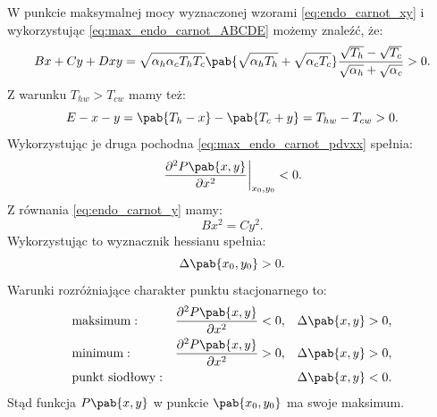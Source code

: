 W punkcie maksymalnej mocy wyznaczonej wzorami \eqref{eq:endo_carnot_xy} i wykorzystując \eqref{eq:max_endo_carnot_ABCDE} możemy znaleźć, że:
\begin{equation}
	Bx+Cy+Dxy = \sqrt{\alpha_{h}\alpha_{c}T_{h}T_{c}}\pab{\sqrt{\alpha_{h}T_{h}} + \sqrt{\alpha_{c}T_{c}}} \frac{\sqrt{T_{h}} - \sqrt{T_{c}}}{\sqrt{\alpha_{h}} + \sqrt{\alpha_{c}}} > 0.
\end{equation}
Z warunku \(T_{hw} > T_{cw}\) mamy też:
\begin{equation}
	E-x-y = \pab{T_h - x} - \pab{T_c + y} = T_{hw} - T_{cw} > 0.
\end{equation}
Wykorzystując je druga pochodna \eqref{eq:max_endo_carnot_pdvxx} spełnia:
\begin{equation}
	\pdv[order=2,delims-eval=.|]{P\pab{x,y}}{x}_{x_0,y_0} < 0.
\end{equation}
Z równania \eqref{eq:endo_carnot_y} mamy:
\begin{equation}
	Bx^2 = Cy^2.
\end{equation}
Wykorzystując to wyznacznik hessianu spełnia:
\begin{equation}
	\Delta\pab{x_0,y_0} > 0.
\end{equation}
Warunki rozróżniające charakter punktu stacjonarnego to:
\begin{align*}
	&\text{maksimum}: &
	\pdv[order=2]{P\pab{x,y}}{x} &< 0, &
	\Delta\pab{x,y} &> 0, \\
	&\text{minimum}: &
	\pdv[order=2]{P\pab{x,y}}{x} &> 0, &
	\Delta\pab{x,y} &> 0, \\
	&\text{punkt siodłowy}: &
	&&
	\Delta\pab{x,y} &< 0. \\
\end{align*}
Stąd funkcja \(P\pab{x,y}\) w punkcie \(\pab{x_0,y_0}\) ma swoje maksimum.
